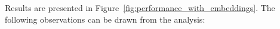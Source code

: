 



Results are presented in Figure~\ref{fig:performance_with_embeddings}. The following observations can be drawn from the analysis:


